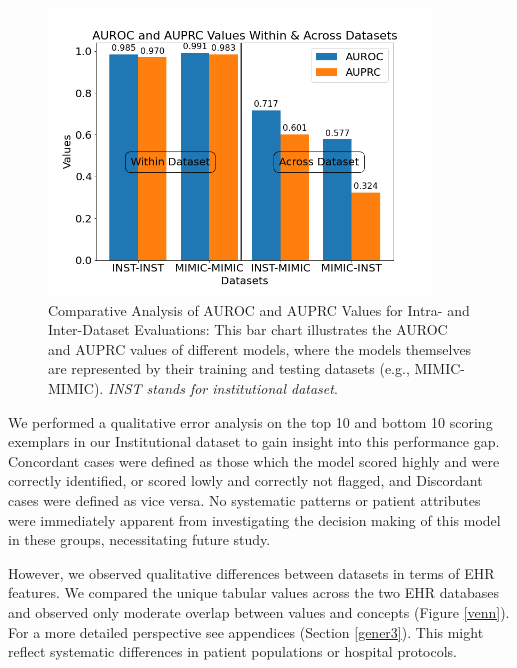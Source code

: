 \documentclass[pmlr]{jmlr}%
\begin{document}
{\begin{figure}[h!]
\vskip 0.2in
\begin{center}
\label{bar}
\centerline{\includegraphics[width=4in]{bar2.png}}
\caption{Comparative Analysis of AUROC and AUPRC Values for Intra- and Inter-Dataset Evaluations: This bar chart illustrates the AUROC and AUPRC values of different models, where the models themselves are represented by their training and testing datasets (e.g., MIMIC-MIMIC). \textit{INST stands for institutional dataset}.}
\label{bar13}
\end{center}
\vskip -0.2in
\end{figure}

We performed a qualitative error analysis on the top 10 and bottom 10 scoring exemplars in our Institutional dataset to gain insight into this performance gap. Concordant cases were defined as those which the model scored highly and were correctly identified, or scored lowly and correctly not flagged, and Discordant cases were defined as vice versa. No systematic patterns or patient attributes were immediately apparent from investigating the decision making of this model in these groups, necessitating future study. 

However, we observed qualitative differences between datasets in terms of EHR features. {We compared the unique tabular values across the two EHR databases and observed only moderate overlap between values and concepts} (Figure \ref{venn}). For a more detailed perspective see appendices (Section \ref{gener3}). This might reflect systematic differences in patient populations or hospital protocols. 

}
\end{document}
